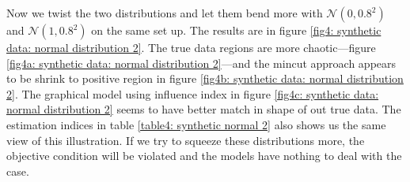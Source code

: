 \begin{table}[ht!]
	\centering
	\captionsetup{justification=centering}
	\caption{Measurement of inferences on $\mathcal{N}(0, 0.6^2)$ and $\mathcal{N}(1, 0.6^2)$.}
	\label{table4: synthetic normal 1}
\end{table}

Now we twist the two distributions and let them bend more with $\mathcal{N}(0, 0.8^2)$ and $\mathcal{N}(1, 0.8^2)$ on the same set up. The results are in figure \ref{fig4: synthetic data: normal distribution 2}. The true data regions are more chaotic---figure \ref{fig4a: synthetic data: normal distribution 2}---and the mincut approach appears to be shrink to positive region in figure \ref{fig4b: synthetic data: normal distribution 2}. The graphical model using influence index in figure \ref{fig4c: synthetic data: normal distribution 2} seems to have better match in shape of out true data. The estimation indices in table \ref{table4: synthetic normal 2} also shows us the same view of this illustration. If we try to squeeze these distributions more, the objective condition will be violated and the models have nothing to deal with the case.

